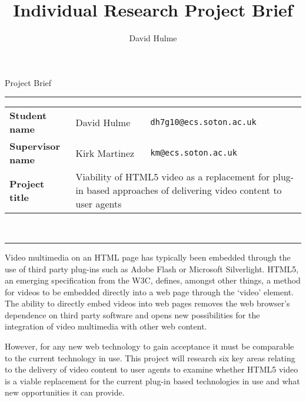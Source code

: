\documentclass[a4paper]{article}
\title{Individual Research Project Brief}
\author{David Hulme}
\begin{document}
\pagestyle{fancy}
\fancyhead{}
\fancyfoot{}
\fancyfoot[LO,LE]{\thepage}
\fancyfoot[RO, RE]{\today}

\begin{center}
\huge{Project Brief}\\
[1cm]
\end{center}
\hrule
\begin{tabular}{p{5cm}p{4cm}p{4cm}}
    
        \textbf{Student name}         & David Hulme   & \texttt{dh7g10@ecs.soton.ac.uk} \\ 
        \textbf{Supervisor name}      & Kirk Martinez & \texttt{km@ecs.soton.ac.uk}     \\ 
        \textbf{Project title} & \multicolumn{2}{p{10cm}}{Viability of HTML5 video as a replacement for plug-in based approaches of delivering video content to user agents} \\

\end{tabular} \\
[0.2cm]
\hrule
\vspace{0.4cm}
Video multimedia on an HTML page has typically been embedded through the use of third party plug-ins such as Adobe Flash or Microsoft Silverlight. HTML5, an emerging specification from the W3C, defines, amongst other things, a method for videos to be embedded directly into a web page through the `video' element. The ability to directly embed videos into web pages removes the web browser's dependence on third party software and opens new possibilities for the integration of video multimedia with other web content.

However, for any new web technology to gain acceptance it must be comparable to the current technology in use. This project will research six key areas relating to the delivery of video content to user agents to examine whether HTML5 video is a viable replacement for the current plug-in based technologies in use and what new opportunities it can provide.
\end{document}
